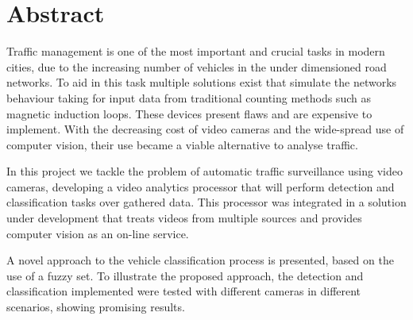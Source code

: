 \chapter*{Abstract}

Traffic management is one of the most important and crucial tasks in modern cities, due to the increasing number of vehicles in the under dimensioned road networks. To aid in this task multiple solutions exist that simulate the networks behaviour taking for input data from traditional counting methods such as magnetic induction loops. These devices present flaws and are expensive to implement. With the decreasing cost of video cameras and the wide-spread use of computer vision, their use became a viable alternative to analyse traffic.

In this project we tackle the problem of automatic traffic surveillance using video cameras, developing a video analytics processor that will perform detection and classification tasks over gathered data. This processor was integrated in a solution under development that treats videos from multiple sources and provides computer vision as an on-line service.

A novel approach to the vehicle classification process is presented, based on the use of a fuzzy set. To illustrate the proposed approach, the detection and classification implemented were tested with different cameras in different scenarios, showing promising results. 
